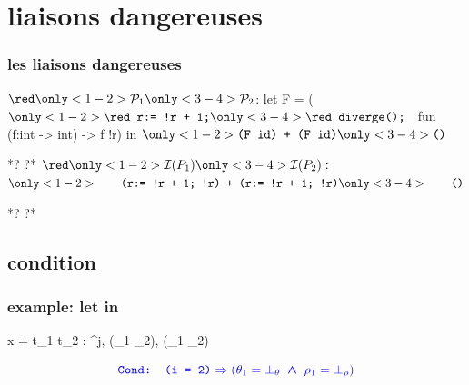 \documentclass[xcolor=dvipsnames]{beamer}
\newcommand{\bwedge}{\boldsymbol{~\wedge~}}
\newcommand{\bvee}{\boldsymbol{~\vee~}}
\begin{document}
\section*{liaisons dangereuses}
\begin{frame}[fragile]
\frametitle{les liaisons dangereuses}
\begin{small}
\begin{whycode} 
${\red \only<1-2>{\mathcal{P}_1}\only<3-4>{\mathcal{P}_2}}$: 
   let F = ($\only<1-2>{\texttt{\red r:= !r + 1;}}\only<3-4>{\texttt{\red diverge(); }}$ fun (f:int -> int) -> f !r)
   in $\only<1-2>{\texttt{(F id) + (F id)}}\only<3-4>{\texttt{()}}$
   
*?%
?* 
${\red\only<1-2>{ \mathcal{I}(P_1)}\only<3-4>{\mathcal{I}(P_2)}}:$ 
$\only<1-2>{\qquad \texttt{(r:= !r + 1; !r) + (r:= !r + 1; !r)}}
\only<3-4>{\qquad \texttt{()}}$ 
   
*?%
?*
\end{whycode} \bigskip
{}
\end{small}
\end{frame}


\subsection*{condition}
\begin{frame}[fragile]
\frametitle{example: let in}
			{\vspace*{-1em}\hspace*{-2.1em}{\red \Gamma} \vdash {} x = t_1  t_2 
				: {\red \tau^{j}, 
				(\theta_1 \bvee \theta_2), 
				(\rho_1 \bvee \rho_2)} \phantom{tttttttt}}

\bigskip
$$ \textcolor{blue}{\texttt{Cond: } \texttt{(i = 2)} \Rightarrow 
			(\theta_1 = \bot_{\theta}\bwedge \rho_1 = \bot_{\rho})}$$
\end{frame}
\addtocounter{framenumber}{-1}
\end{document}
